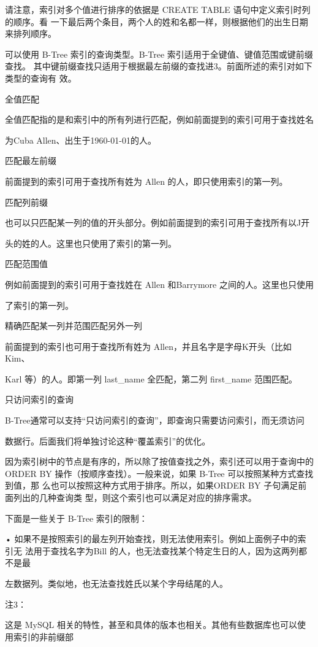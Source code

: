 请注意，索引对多个值进行排序的依据是 CREATE TABLE 语句中定义索引时列的顺序。看
一下最后两个条目，两个人的姓和名都一样，则根据他们的出生日期来排列顺序。

可以使用 B-Tree 索引的查询类型。B-Tree 索引适用于全键值、键值范围或键前缀查找。
其中键前缀查找只适用于根据最左前缀的查找进3。前面所述的索引对如下类型的查询有
效。

全值匹配

全值匹配指的是和索引中的所有列进行匹配，例如前面提到的索引可用于查找姓名

为Cuba Allen、出生于1960-01-01的人。

匹配最左前缀

前面提到的索引可用于查找所有姓为 Allen 的人，即只使用索引的第一列。

匹配列前缀

也可以只匹配某一列的值的开头部分。例如前面提到的索引可用于查找所有以J开

头的姓的人。这里也只使用了索引的第一列。

匹配范围值

例如前面提到的索引可用于查找姓在 Allen 和Barrymore 之间的人。这里也只使用

了索引的第一列。

精确匹配某一列并范围匹配另外一列

前面提到的索引也可用于查找所有姓为 Allen，并且名字是字母K开头（比如Kim、

Karl 等）的人。即第一列 last\_name 全匹配，第二列 first\_name 范围匹配。

只访问索引的查询

B-Tree通常可以支持“只访问索引的查询”，即查询只需要访问索引，而无须访问

数据行。后面我们将单独讨论这种“覆盖索引”的优化。

因为索引树中的节点是有序的，所以除了按值查找之外，索引还可以用于查询中的
ORDER BY 操作（按顺序查找）。一般来说，如果 B-Tree 可以按照某种方式查找到值，那
么也可以按照这种方式用于排序。所以，如果ORDER BY 子句满足前面列出的几种查询类
型，则这个索引也可以满足对应的排序需求。

下面是一些关于 B-Tree 索引的限制：

• 如果不是按照索引的最左列开始查找，则无法使用索引。例如上面例子中的索引无
法用于查找名字为Bill 的人，也无法查找某个特定生日的人，因为这两列都不是最

左数据列。类似地，也无法查找姓氏以某个字母结尾的人。

注3：

这是 MySQL 相关的特性，甚至和具体的版本也相关。其他有些数据库也可以使用索引的非前缀部


